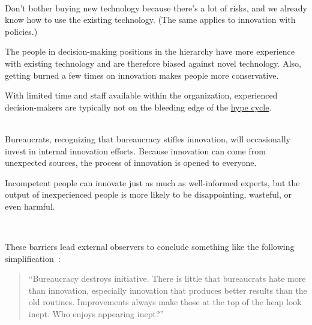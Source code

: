 \ \\

Don't bother buying new technology because there's a lot of risks, and we already know how to use the existing technology. (The same applies to innovation with policies.)

The people in decision-making positions in the hierarchy have more experience with existing technology and are therefore biased against novel technology. Also, getting burned a few times on innovation makes people more conservative.

With limited time and staff available within the organization, experienced decision-makers are typically not on the bleeding edge of the \href{https://en.wikipedia.org/wiki/Gartner_hype_cycle}{hype cycle}.

\ \\

Bureaucrats, recognizing that bureaucracy stifles innovation, will occasionally invest in internal innovation efforts. Because innovation can come from unexpected sources, the process of innovation is opened to everyone. 

Incompetent people can innovate just as much as well-informed experts, but the output of inexperienced people is more likely to be disappointing, wasteful, or even harmful. 

\ \\

\begin{samepage}
These barriers lead external observers to conclude something like the following simplification~\cite{1987_Herbert}:
\begin{quote}
``Bureaucracy destroys initiative. There is little that bureaucrats hate more than innovation, especially innovation that produces better results than the old routines.
%
%
Improvements always make those at the top of the heap look inept. Who enjoys appearing inept?''
\end{quote}
\end{samepage}
